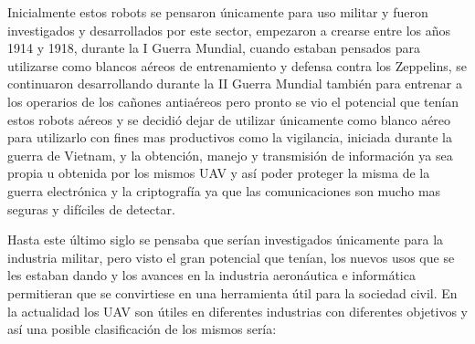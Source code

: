 \hspace{1cm} Inicialmente estos robots se pensaron únicamente para uso militar y fueron investigados y desarrollados por este sector, empezaron a crearse entre los años 1914 y 1918, durante la I Guerra Mundial, cuando estaban pensados para utilizarse como blancos aéreos de entrenamiento y defensa contra los Zeppelins, se continuaron desarrollando durante la II Guerra Mundial también para entrenar a los operarios de los cañones antiaéreos pero pronto se vio el potencial que tenían estos robots aéreos y se decidió dejar de utilizar únicamente como blanco aéreo para utilizarlo con fines mas productivos como la vigilancia, iniciada durante la guerra de Vietnam,  y la obtención, manejo y transmisión de información ya sea propia u obtenida por los mismos UAV y así poder proteger la misma de la guerra electrónica y la criptografía ya que las comunicaciones son mucho mas seguras y difíciles de detectar.

\hspace{1cm} Hasta este último siglo se pensaba que serían investigados únicamente para la industria militar, pero visto el gran potencial que tenían, los nuevos usos que se les estaban dando y los avances en  la industria aeronáutica e informática permitieran que se convirtiese en una herramienta útil para la sociedad civil. En la actualidad los UAV son útiles en diferentes industrias con diferentes objetivos y así una posible clasificación de los mismos sería:

